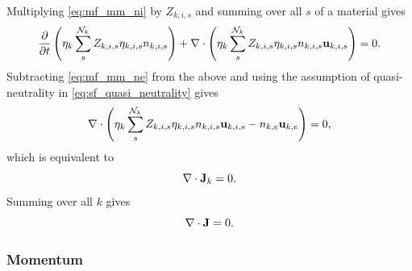 \documentclass[a4paper,11pt]{report}
\begin{document}
Multiplying \cref{eq:mf_mm_ni} by $Z_{k,i,s}$ and summing over all $s$ of a material gives
\begin{equation*}
    \frac{\partial}{\partial t} \left( \eta_k \sum_s^{\mathcal{N}_k} Z_{k,i,s} \eta_{k,i,s} n_{k,i,s} \right) + \nabla \cdot \left( \eta_k \sum_s^{\mathcal{N}_k} Z_{k,i,s} \eta_{k,i,s} n_{k,i,s} \mathbf{u}_{k,i,s} \right) = 0.
\end{equation*}
Subtracting \cref{eq:mf_mm_ne} from the above and using the assumption of quasi-neutrality in \cref{eq:sf_quasi_neutrality} gives
\begin{equation*}
    \nabla \cdot \left( \eta_k \sum_s^{\mathcal{N}_k} Z_{k,i,s} \eta_{k,i,s} n_{k,i,s} \mathbf{u}_{k,i,s} - n_{k,e} \mathbf{u}_{k,e} \right) = 0,
\end{equation*}
which is equivalent to
\begin{equation*}
    \nabla \cdot \mathbf{J}_k = 0.
\end{equation*}
Summing over all $k$ gives
\begin{equation*}
    \nabla \cdot \mathbf{J} = 0.
\end{equation*}

\subsubsection{Momentum}
\end{document}
